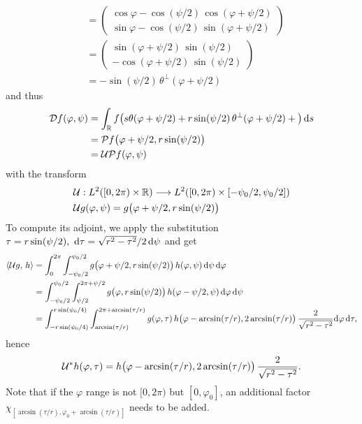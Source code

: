 \documentclass{amsart}
\renewcommand*{\phi}{\varphi}
\begin{document}
\begin{example}
\begin{align*}
  &=
  \begin{pmatrix}
   \cos\phi - \cos(\psi/2)\, \cos(\phi + \psi/2) \\
   \sin\phi - \cos(\psi/2)\, \sin(\phi + \psi/2)
  \end{pmatrix} \\
  &=
  \begin{pmatrix}
   \sin(\phi + \psi/2)\, \sin(\psi/2) \\
   -\cos(\phi + \psi/2)\, \sin(\psi/2)
  \end{pmatrix} \\
  &= -\sin(\psi/2)\, \theta^\perp(\phi + \psi/2)
 \end{align*}
 and thus 
 \begin{align*}
  \OPD f(\phi, \psi)
  &= \int_\RR f\big(s \theta(\phi + \psi/2) + r \sin(\psi/2)\, \theta^\perp(\phi + \psi/2) + \big)\, \D s \\
  &= \OPP f\big(\phi + \psi/2, r\sin(\psi/2)\big) \\
  &= \OPU \OPP f(\phi, \psi)
 \end{align*}
 with the transform
 \begin{align}
  \label{eq:fanbeam_unit_trafo}
  &\OPU: L^2([0,2\pi) \times \RR) \Lto L^2([0,2\pi) \times [-\psi_0/2,\psi_0/2]) \\
  &\OPU g(\phi, \psi) = g\big(\phi + \psi/2, r\sin(\psi/2)\big)
 \end{align} 
 To compute its adjoint, we apply the substitution $\tau = r\sin(\psi/2),\ \mathrm{d}\tau = \sqrt{r^2-\tau^2} / 2\, \mathrm{d} \psi$ and get
 \begin{align*}
  \INNER{\OPU g}{h} 
  &= \int_0^{2\pi} \int_{-\psi_0/2}^{\psi_0/2} g\big(\phi + \psi/2, r\sin(\psi/2)\big)\, h(\phi, \psi)\, \D\psi\, \D\phi \\
  &= \int_{-\psi_0/2}^{\psi_0/2} \int_{\psi/2}^{2\pi + \psi/2} g\big(\phi, r\sin(\psi/2)\big)\, h(\phi - \psi/2, \psi)\, \D\phi\, \D\psi \\
  &= \int_{-r\sin(\psi_0/4)}^{r\sin(\psi_0/4)} \int_{\arcsin(\tau/r)}^{2\pi + \arcsin(\tau/r)} g(\phi, \tau)\, 
  h\big(\phi - \arcsin(\tau/r), 2\arcsin(\tau/r)\big)\, \frac{2}{\sqrt{r^2-\tau^2}} \D\phi\, \D\tau,
 \end{align*}
 hence
 \begin{equation}
  \DUALOPU h(\phi, \tau) = h\big(\phi - \arcsin(\tau/r), 2\arcsin(\tau/r)\big)\, \frac{2}{\sqrt{r^2-\tau^2}}.
 \end{equation}
 Note that if the $\phi$ range is not $[0,2\pi)$ but $[0,\phi_0]$, an additional factor $\chi_{[\arcsin(\tau/r), \phi_0 + 
\arcsin(\tau/r)]}$  needs to be added.
\end{example}
\end{document}
